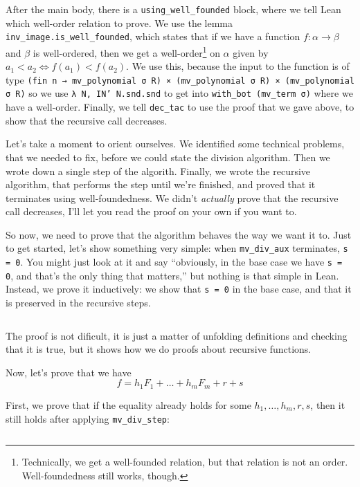 \documentclass[a4paper, 12pt]{article}
\newcommand{\lean}[1]{\texttt{#1}}
\theoremstyle{changedot}
\theoremstyle{changedotbreak}
\theoremstyle{nonumberplain}
\begin{document}
After the main body, there is a \lean{using_well_founded} block, where we tell Lean which well-order relation to prove. We use the lemma \lean{inv_image.is_well_founded}, which states that if we have a function $f : \alpha \to \beta$ and $\beta$ is well-ordered, then we get a well-order\footnote{Technically, we get a well-founded relation, but that relation is not an order. Well-foundedness still works, though.} on $\alpha$ given by $a_{1} < a_{2} \iff f(a_{1}) < f(a_{2})$. We use this, because the input to the function is of type \lean{(fin n → mv_polynomial σ R) ×
  (mv_polynomial σ R) × (mv_polynomial σ R)} so we use \lean{λ N, IN' N.snd.snd} to get into \lean{with_bot (mv_term σ)} where we have a well-order. Finally, we tell \lean{dec_tac} to use the proof that we gave above, to show that the recursive call decreases.

Let's take a moment to orient ourselves. We identified some technical problems, that we needed to fix, before we could state the division algorithm. Then we wrote down a single step of the algorith. Finally, we wrote the recursive algorithm, that performs the step until we're finished, and proved that it terminates using well-foundedness. We didn't \textit{actually} prove that the recursive call decreases, I'll let you read the proof on your own if you want to.

So now, we need to prove that the algorithm behaves the way we want it to. Just to get started, let's show something very simple: when \lean{mv_div_aux} terminates, \lean{s = 0}. You might just look at it and say ``obviously, in the base case we have \lean{s = 0}, and that's the only thing that matters,'' but nothing is that simple in Lean. Instead, we prove it inductively: we show that \lean{s = 0} in the base case, and that it is preserved in the recursive steps.

\inputminted[firstline=334, lastline=357]{lean}{../src/mv_division.lean}

The proof is not dificult, it is just a matter of unfolding definitions and checking that it is true, but it shows how we do proofs about recursive functions.

Now, let's prove that we have \[f = h_{1}F_{1} + \dots + h_{m}F_{m} + r + s\]

First, we prove that if the equality already holds for some $h_{1}, \dots, h_{m}, r, s$, then it still holds after applying \lean{mv_div_step}:

\inputminted[firstline=61, lastline=68]{lean}{../src/mv_division.lean}
\end{document}
